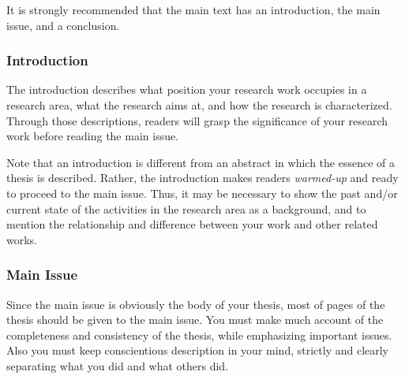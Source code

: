 \documentclass[master,english]{kuisthesis}
\begin{document}
It is strongly recommended that the main text has an introduction, the main
issue, and a conclusion.

\subsubsection{Introduction}\label{subsubsec-intro}
The introduction describes what position your research work occupies in a
research area, what the research aims at, and how the research is
characterized.   Through those descriptions, readers will grasp the
significance of your research work before reading the main issue.

Note that an introduction is different from an abstract in which the essence
of a thesis is described.  Rather, the introduction makes readers {\em
warmed-up} and ready to proceed to the main issue.  Thus, it may be
necessary to show the past and/or current state of the activities in the
research area as a background, and to mention the relationship and
difference between your work and other related works.

\subsubsection{Main Issue}\label{subsubsec-main}
Since the main issue is obviously the body of your thesis, most of pages of
the thesis should be given to the main issue.  You must make much account of
the completeness and consistency of the thesis, while emphasizing important
issues.  Also you must keep conscientious description in your mind, strictly
and clearly separating what you did and what others did.
\end{document}

